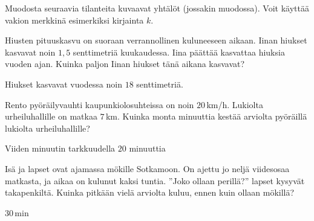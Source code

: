 \begin{tehtavasivu}
\begin{tehtava}
\begin{vastaus}
{        }
    \end{vastaus}
\end{tehtava}

\begin{tehtava}
Muodosta seuraavia tilanteita kuvaavat yhtälöt (jossakin muodossa). Voit käyttää vakion merkkinä esimerkiksi kirjainta $k$.
	\begin{vastaus}
	\end{vastaus}
\end{tehtava}

\begin{tehtava}
Hiusten pituuskasvu on suoraan verrannollinen kuluneeseen aikaan. Iinan hiukset kasvavat noin $1,5$ senttimetriä kuukaudessa. Iina päättää kasvattaa hiuksia vuoden ajan. Kuinka paljon Iinan hiukset tänä aikana kasvavat?
	\begin{vastaus}
Hiukset kasvavat vuodessa noin $18$ senttimetriä.
	\end{vastaus}
\end{tehtava}

\begin{tehtava}
Rento pyöräilyvauhti kaupunkiolosuhteissa on noin $20$\,km/h. Lukiolta urheiluhallille on matkaa $7$\,km. Kuinka monta minuuttia kestää arviolta pyöräillä lukiolta urheiluhallille?
	\begin{vastaus}
Viiden minuutin tarkkuudella $20$ minuuttia
	\end{vastaus}
\end{tehtava}

\begin{tehtava}
Isä ja lapset ovat ajamassa mökille Sotkamoon. On ajettu jo neljä viidesosaa matkasta, ja aikaa on kulunut kaksi tuntia. ''Joko ollaan perillä?'' lapset kysyvät takapenkiltä. Kuinka pitkään vielä arviolta kuluu, ennen kuin ollaan mökillä?
    \begin{vastaus}
        $30$\,min
    \end{vastaus}
\end{tehtava}


\end{tehtavasivu}
